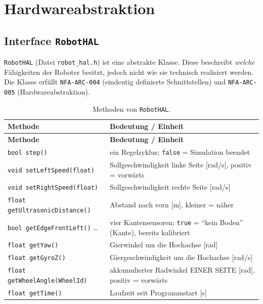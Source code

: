 \documentclass[
  a4paper,
  12pt,
  DIV=12,        %
  parskip=half,  %
  headings=small %
]{scrartcl}
\theoremstyle{definition}
\theoremstyle{definition}
\begin{document}
\section{Hardwareabstraktion}\label{hardwareabstraktion}

\subsection{Interface \texttt{RobotHAL}}\label{robothal}

\texttt{RobotHAL} (Datei \texttt{robot\_hal.h}) ist eine abstrakte
Klasse. Diese beschreibt  \emph{welche} Fähigkeiten der
Roboter besitzt, jedoch nicht wie sie technisch realisiert werden. Die Klasse
erfüllt \texttt{NFA-ARC-004} (eindeutig definierte Schnittstellen) und
\texttt{NFA-ARC-005} (Hardwareabstraktion).

\begin{longtable}[]{@{}p{}p{}@{}}
\caption{Methoden von \texttt{RobotHAL}.}\label{tab:hal}\\
\toprule
\textbf{Methode} & \textbf{Bedeutung / Einheit}\\
\midrule
\endfirsthead
\toprule
\textbf{Methode} & \textbf{Bedeutung / Einheit}\\
\midrule
\endhead
\bottomrule
\endfoot
\texttt{bool step()} & ein Regelzyklus; \texttt{false} = Simulation beendet\\
\texttt{void setLeftSpeed(float)} & Sollgeschwindigkeit linke Seite [rad/s], positiv = vorwärts\\
\texttt{void setRightSpeed(float)} & Sollgeschwindigkeit rechte Seite [rad/s]\\
\texttt{float getUltrasonicDistance()} & Abstand nach vorn [m], kleiner = näher\\
\texttt{bool getEdgeFrontLeft()} \ldots & vier Kantensensoren; \texttt{true} = \enquote{kein Boden} (Kante), bereits kalibriert\\
\texttt{float getYaw()} & Gierwinkel um die Hochachse [rad]\\
\texttt{float getGyroZ()} & Giergeschwindigkeit um die Hochachse [rad/s]\\
\texttt{float getWheelAngle(WheelId)} & akkumulierter Radwinkel EINER SEITE [rad], positiv = vorwärts\\
\texttt{float getTime()} & Laufzeit seit Programmstart [s]\\
\bottomrule
\end{longtable}
\end{document}
